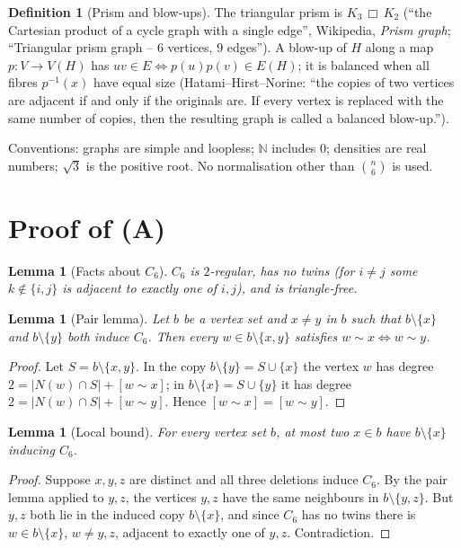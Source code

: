 \documentclass[11pt]{article}
\newtheorem{lemma}[theorem]{Lemma}
\theoremstyle{definition}
\newtheorem{definition}[theorem]{Definition}
\begin{document}
\begin{definition}[Prism and blow-ups]
The triangular prism is $K_3 \,\Box\, K_2$ (``the Cartesian product of a cycle graph with a single
edge'', Wikipedia, \emph{Prism graph}; ``Triangular prism graph -- 6 vertices, 9 edges''). A
blow-up of $H$ along a map $p\colon V \to V(H)$ has $uv \in E \iff p(u)p(v) \in E(H)$; it is balanced
when all fibres $p^{-1}(x)$ have equal size (Hatami--Hirst--Norine: ``the copies of two vertices are
adjacent if and only if the originals are. If every vertex is replaced with the same number of
copies, then the resulting graph is called a balanced blow-up.'').
\end{definition}

Conventions: graphs are simple and loopless; $\mathbb{N}$ includes $0$; densities are real numbers;
$\sqrt{3}$ is the positive root. No normalisation other than $\binom n6$ is used.

\section*{Proof of (A)}
\begin{lemma}[Facts about $C_6$]
$C_6$ is $2$-regular, has no twins (for $i \neq j$ some $k \notin\{i,j\}$ is adjacent to exactly one of
$i,j$), and is triangle-free.
\end{lemma}

\begin{lemma}[Pair lemma]
Let $b$ be a vertex set and $x \ne y$ in $b$ such that $b\setminus\{x\}$ and $b\setminus\{y\}$
both induce $C_6$. Then every $w \in b\setminus\{x,y\}$ satisfies $w \sim x \iff w \sim y$.
\end{lemma}
\begin{proof}
Let $S = b\setminus\{x,y\}$. In the copy $b\setminus\{y\} = S \cup\{x\}$ the vertex $w$ has
degree $2 = |N(w)\cap S| + [w\sim x]$; in $b\setminus\{x\} = S\cup\{y\}$ it has degree
$2 = |N(w)\cap S| + [w\sim y]$. Hence $[w\sim x] = [w \sim y]$.
\end{proof}

\begin{lemma}[Local bound]
For every vertex set $b$, at most two $x \in b$ have $b\setminus\{x\}$ inducing $C_6$.
\end{lemma}
\begin{proof}
Suppose $x,y,z$ are distinct and all three deletions induce $C_6$. By the pair lemma applied to $y,z$,
the vertices $y,z$ have the same neighbours in $b\setminus\{y,z\}$. But $y,z$ both lie in the induced
copy $b\setminus\{x\}$, and since $C_6$ has no twins there is $w \in b\setminus\{x\}$, $w\ne y,z$, adjacent
to exactly one of $y,z$. Contradiction.
\end{proof}
\end{document}
